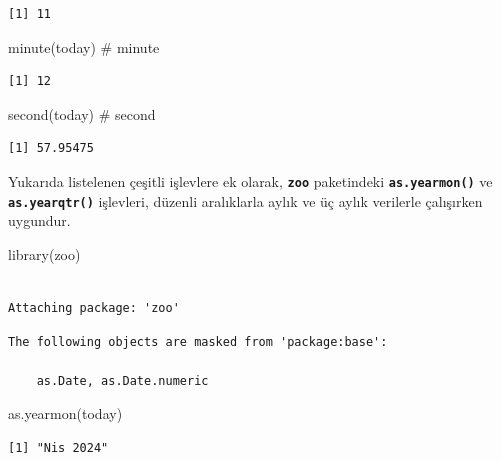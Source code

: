 \documentclass[
  letterpaper,
  DIV=11,
  numbers=noendperiod]{scrreprt}
\newenvironment{Shaded}{\begin{snugshade}}{\end{snugshade}}
\newcommand{\CommentTok}[1]{\textcolor[rgb]{0.37,0.37,0.37}{#1}}
\newcommand{\FunctionTok}[1]{\textcolor[rgb]{0.28,0.35,0.67}{#1}}
\newcommand{\NormalTok}[1]{\textcolor[rgb]{0.00,0.23,0.31}{#1}}
\begin{document}
\begin{verbatim}
[1] 11
\end{verbatim}

\begin{Shaded}
\begin{Highlighting}[]
\FunctionTok{minute}\NormalTok{(today) }\CommentTok{\# minute}
\end{Highlighting}
\end{Shaded}

\begin{verbatim}
[1] 12
\end{verbatim}

\begin{Shaded}
\begin{Highlighting}[]
\FunctionTok{second}\NormalTok{(today) }\CommentTok{\# second}
\end{Highlighting}
\end{Shaded}

\begin{verbatim}
[1] 57.95475
\end{verbatim}

Yukarıda listelenen çeşitli işlevlere ek olarak, \textbf{\texttt{zoo}}
paketindeki \textbf{\texttt{as.yearmon()}} ve
\textbf{\texttt{as.yearqtr()}} işlevleri, düzenli aralıklarla aylık ve
üç aylık verilerle çalışırken uygundur.

\begin{Shaded}
\begin{Highlighting}[]
\FunctionTok{library}\NormalTok{(zoo)}
\end{Highlighting}
\end{Shaded}

\begin{verbatim}

Attaching package: 'zoo'
\end{verbatim}

\begin{verbatim}
The following objects are masked from 'package:base':

    as.Date, as.Date.numeric
\end{verbatim}

\begin{Shaded}
\begin{Highlighting}[]
\FunctionTok{as.yearmon}\NormalTok{(today)}
\end{Highlighting}
\end{Shaded}

\begin{verbatim}
[1] "Nis 2024"
\end{verbatim}
\end{document}
